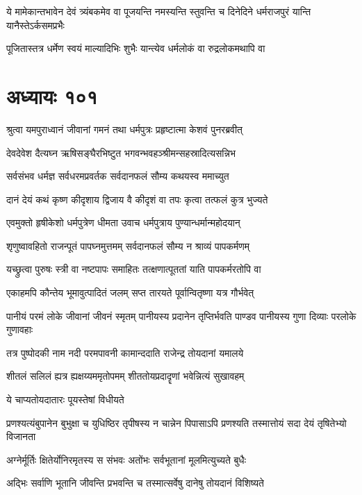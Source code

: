 \threelineshloka
{ये मामेकान्तभावेन देवं त्र्यंबकमेव वा}
{पूजयन्ति नमस्यन्ति स्तुवन्ति च दिनेदिने}
{धर्मराजपुरं यान्ति यानैस्तेऽर्कसमप्रभैः}


\twolineshloka
{पूजितास्तत्र धर्मेण स्वयं माल्यादिभिः शुभैः}
{यान्त्येव धर्मलोकं वा रुद्रलोकमथापि वा}


\chapter{अध्यायः १०१}
\twolineshloka
{श्रुत्वा यमपुराध्वानं जीवानां गमनं तथा}
{धर्मपुत्रः प्रहृष्टात्मा केशवं पुनरब्रवीत्}


\twolineshloka
{देवदेवेश दैत्यघ्न ऋषिसङ्घैरभिष्टुत}
{भगवन्भवहञ्श्रीमन्सहस्रादित्यसन्निभ}


\twolineshloka
{सर्वसंभव धर्मज्ञ सर्वधरमप्रवर्तक}
{सर्वदानफलं सौम्य कथयस्व ममाच्युत}


\twolineshloka
{दानं देयं कथं कृष्ण कीदृशाय द्विजाय वै}
{कीदृशं वा तपः कृत्वा तत्फलं कुत्र भुज्यते}


\twolineshloka
{एवमुक्तो हृषीकेशो धर्मपुत्रेण धीमता}
{उवाच धर्मपुत्राय पुण्यान्धर्मान्महोदयान्}


\twolineshloka
{शृणुष्वावहितो राजन्पूतं पापघ्नमुत्तमम्}
{सर्वदानफलं सौम्य न श्राव्यं पापकर्मणम्}


\twolineshloka
{यच्छ्रुत्वा पुरुषः स्त्री वा नष्टपापः समाहितः}
{तत्क्षणात्पूततां याति पापकर्मरतोपि वा}


\twolineshloka
{एकाहमपि कौन्तेय भूमावुत्पादितं जलम्}
{सप्त तारयते पूर्वान्वितृष्णा यत्र गौर्भवेत्}


\threelineshloka
{पानीयं परमं लोके जीवानां जीवनं स्मृतम्}
{पानीयस्य प्रदानेन तृप्तिर्भवति पाण्डव}
{पानीयस्य गुणा दिव्याः परलोके गुणावहाः}


\twolineshloka
{तत्र पुष्पोदकी नाम नदी परमपावनी}
{कामान्ददाति राजेन्द्र तोयदानां यमालये}


\twolineshloka
{शीतलं सलिलं ह्यत्र ह्यक्षय्यममृतोपमम्}
{शीततोयप्रदादॄणां भवेन्नित्यं सुखावहम्}


\twolineshloka
{ये चाप्यतोयदातारः पूयस्तेषां विधीयते}
{}


\fourlineindentedshloka
{प्रणश्यत्यंबुपानेन बुभुक्षा च युधिष्ठिर}
{तृपीषस्य न चान्नेन पिपासाऽपि प्रणश्यति}
{तस्मात्तोयं सदा देयं तृषितेभ्यो विजानता}
{}


\twolineshloka
{अग्नेर्मूर्तिः क्षितेर्योनिरमृतस्य स संभवः}
{अतोंभः सर्वभूतानां मूलमित्युच्यते बुधैः}


\twolineshloka
{अद्भिः सर्वाणि भूतानि जीवन्ति प्रभवन्ति च}
{तस्मात्सर्वेषु दानेषु तोयदानं विशिष्यते}


